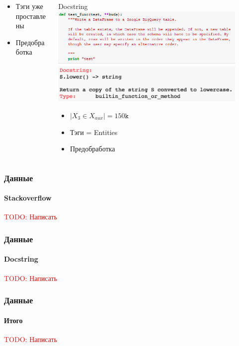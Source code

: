 \documentclass[10pt]{beamer}
\newcommand\TODO[1]{\textcolor{red}{{\Large TODO: #1}}}
\begin{document}
\begin{frame}
\begin{columns}[T]
\begin{column}[T]{0.33\textwidth}
\begin{center}
\begin{itemize}
                \item Тэги уже проставлены
                \item Предобработка
            \end{itemize}
        \end{center}
    \end{column}
    \vline
    \begin{column}[T]{0.33\textwidth}
        \begin{center}
            Docstring \\
            \vskip3mm
            \includegraphics[width=0.9\textwidth]{images/docstring.png} \\
            \vskip3mm
            \includegraphics[width=0.9\textwidth]{images/docstring2.png} \\
            \begin{itemize}
                \item $|X_3 \in X_{aux}| = 150\texttt{k}$
                \item Тэги = Entities
                \item Предобработка
            \end{itemize}
        \end{center}
    \end{column}
\end{columns}

\end{frame}
\begin{frame}
\frametitle{Данные}
\framesubtitle{Stackoverflow}

\TODO{Написать}

\end{frame}
\begin{frame}
\frametitle{Данные}
\framesubtitle{Docstring}

\TODO{Написать}

\end{frame}
\begin{frame}
\frametitle{Данные}
\framesubtitle{Итого}

\TODO{Написать}

\end{frame}
\end{document}

